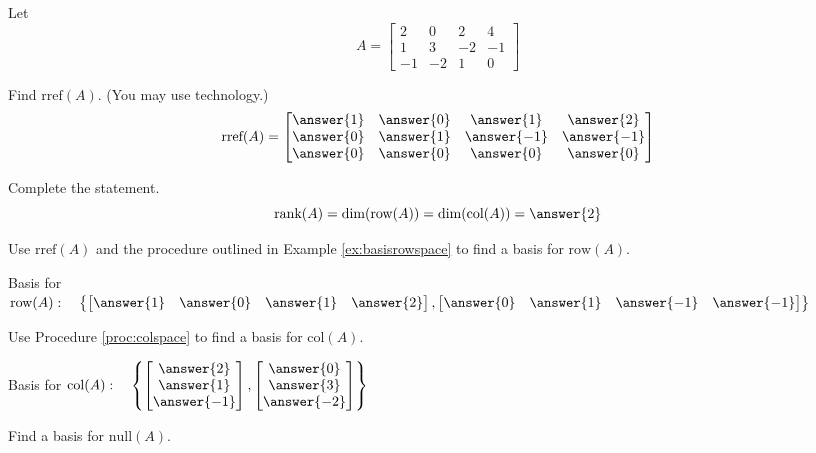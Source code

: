 \documentclass{ximera}
\begin{document}
\begin{problem}\label{prob:colrowmatrixA1}
Let
$$A=\begin{bmatrix}2&0&2&4\\1&3&-2&-1\\-1&-2&1&0\end{bmatrix}$$
\begin{question}
Find $\mbox{rref}(A)$. (You may use technology.)
$$\mbox{rref}(A)=\begin{bmatrix}\answer{1}&\answer{0}&\answer{1}&\answer{2}\\\answer{0}&\answer{1}&\answer{-1}&\answer{-1}\\\answer{0}&\answer{0}&\answer{0}&\answer{0}\end{bmatrix}$$
\end{question}

\begin{question}
Complete the statement.
    $$\mbox{rank}(A)=\mbox{dim}(\mbox{row}(A))=\mbox{dim}(\mbox{col}(A))=\answer{2}$$
\end{question}

\begin{question}
    Use $\mbox{rref}(A)$ and the procedure outlined in Example \ref{ex:basisrowspace} to find a basis for $\mbox{row}(A)$.

Basis for $\mbox{row}(A):\quad
\left\{\begin{bmatrix}\answer{1}& \answer{0}& \answer{1} & \answer{2}\end{bmatrix},\begin{bmatrix}\answer{0} & \answer{1}& \answer{-1} &\answer{-1}\end{bmatrix} \right\}$
\end{question}

\begin{question}
    Use Procedure \ref{proc:colspace} to find a basis for $\mbox{col}(A)$.

Basis for $\mbox{col}(A):\quad
\left\{ \begin{bmatrix}\answer{2}\\\answer{1}\\\answer{-1}\end{bmatrix}, \begin{bmatrix}\answer{0}\\\answer{3}\\\answer{-2}\end{bmatrix}\right\}$
\end{question}

\begin{question}
    Find a basis for $\mbox{null}(A)$.


\end{question}
\end{problem}
\end{document}
